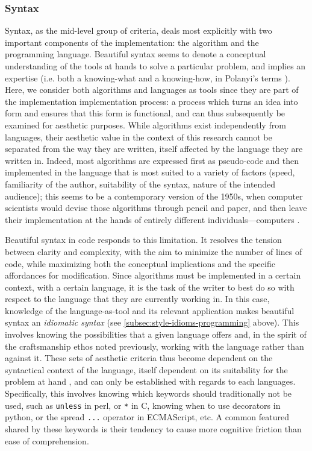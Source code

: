 \subsubsection{Syntax}
\label{subsubsec:framework-syntax}

Syntax, as the mid-level group of criteria, deals most explicitly with two important components of the implementation: the algorithm and the programming language. Beautiful syntax seems to denote a conceptual understanding of the tools at hands to solve a particular problem, and implies an expertise (i.e. both a knowing-what and a knowing-how, in Polanyi's terms \citep{polanyi_knowing_1969}). Here, we consider both algorithms and languages as tools since they are part of the implementation implementation process: a process which turns an idea into form and ensures that this form is functional, and can thus subsequently be examined for aesthetic purposes. While algorithms exist independently from languages, their aesthetic value in the context of this research cannot be separated from the way they are written, itself affected by the language they are written in. Indeed, most algorithms are expressed first as pseudo-code and then implemented in the language that is most suited to a variety of factors (speed, familiarity of the author, suitability of the syntax, nature of the intended audience); this seems to be a contemporary version of the 1950s, when computer scientists would devise those algorithms through pencil and paper, and then leave their implementation at the hands of entirely different individuals—computers \citep{chun_software_2005}.

Beautiful syntax in code responds to this limitation. It resolves the tension between clarity and complexity, with the aim to minimize the number of lines of code, while maximizing both the conceptual implications and the specific affordances for modification. Since algorithms must be implemented in a certain context, with a certain language, it is the task of the writer to best do so with respect to the language that they are currently working in. In this case, knowledge of the language-as-tool and its relevant application makes beautiful syntax an \emph{idiomatic syntax} (see \ref{subsec:style-idioms-programming} above). This involves knowing the possibilities that a given language offers and, in the spirit of the craftsmanship ethos noted previously, working with the language rather than against it. These sets of aesthetic criteria thus become dependent on the syntactical context of the language, itself dependent on its suitability for the problem at hand , and can only be established with regards to each languages. Specifically, this involves knowing which keywords should traditionally not be used, such as \lstinline{unless} in perl, or \lstinline{*} in C, knowing when to use decorators in python, or the spread \lstinline{...} operator in ECMAScript, etc. A common featured shared by these keywords is their tendency to cause more cognitive friction than ease of comprehension.

